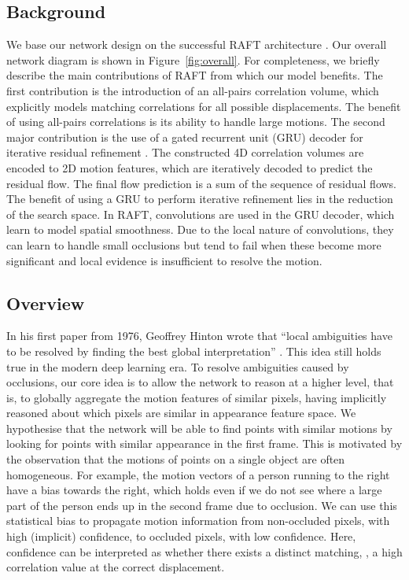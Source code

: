 \documentclass[10pt,twocolumn,letterpaper]{article}
\begin{document}
\subsection{Background}
We base our network design on the successful RAFT architecture \cite{raft}. Our overall network diagram
is shown in Figure~\ref{fig:overall}. For completeness, we briefly describe the main contributions
of RAFT from which our model benefits. The first
contribution is the introduction of an all-pairs correlation volume, which explicitly models matching 
correlations for all possible displacements. The benefit of using all-pairs correlations is its ability
to handle large motions. The second major contribution is the use of a gated recurrent unit (GRU) decoder for iterative residual
refinement \cite{irr}. The constructed 4D correlation volumes are encoded to 2D motion features, which
are iteratively decoded to predict the residual flow. The final flow prediction is a sum of the sequence
of residual flows. The benefit of using a GRU to perform iterative refinement lies in the reduction of the search
space. In RAFT, convolutions are used in the GRU decoder, which learn to model spatial smoothness. Due to
the local nature of convolutions, they can learn to handle small occlusions but tend to fail when these become
more significant and local evidence is insufficient to resolve the motion. 

\subsection{Overview}
In his first paper from 1976, Geoffrey Hinton wrote that ``local ambiguities have to be 
resolved by finding the best global interpretation'' \cite{hinton1976using}. This idea
still holds true in the modern deep learning era. To resolve ambiguities caused by
occlusions, our core idea is to allow the network to reason at a higher level, that is,
to globally aggregate the motion features of similar pixels, having implicitly reasoned about
which pixels are similar in appearance feature space.
We hypothesise that the network will be able to find points with similar motions by looking for points with similar appearance in the first frame.
This is motivated by the observation that the motions of points on a single object are often homogeneous.
For example, the motion vectors of a person running to the right have a bias towards the right, which holds even if we do not see where a large part of the person ends up in the second frame due to occlusion.
We can use this statistical bias to propagate motion information from non-occluded pixels,
with high (implicit) confidence, to occluded pixels, with low confidence. Here, confidence
can be interpreted as whether there exists a distinct matching, \ie, a high correlation value at the correct displacement. 
\end{document}
